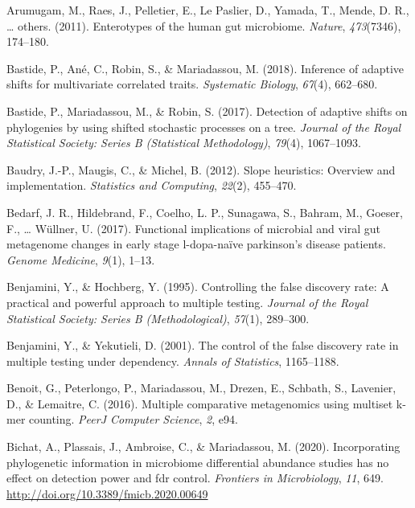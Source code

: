 \documentclass[12pt,a4paper]{reedthesis}
\theoremstyle{definition}
\theoremstyle{definition}
\theoremstyle{definition}
\theoremstyle{remark}
\begin{document}
\leavevmode\hypertarget{ref-arumugam2011enterotypes}{}%
Arumugam, M., Raes, J., Pelletier, E., Le Paslier, D., Yamada, T., Mende, D. R., \ldots{} others. (2011). Enterotypes of the human gut microbiome. \emph{Nature}, \emph{473}(7346), 174--180.

\leavevmode\hypertarget{ref-bastide2018inference}{}%
Bastide, P., Ané, C., Robin, S., \& Mariadassou, M. (2018). Inference of adaptive shifts for multivariate correlated traits. \emph{Systematic Biology}, \emph{67}(4), 662--680.

\leavevmode\hypertarget{ref-bastide2017detection}{}%
Bastide, P., Mariadassou, M., \& Robin, S. (2017). Detection of adaptive shifts on phylogenies by using shifted stochastic processes on a tree. \emph{Journal of the Royal Statistical Society: Series B (Statistical Methodology)}, \emph{79}(4), 1067--1093.

\leavevmode\hypertarget{ref-baudry2012slope}{}%
Baudry, J.-P., Maugis, C., \& Michel, B. (2012). Slope heuristics: Overview and implementation. \emph{Statistics and Computing}, \emph{22}(2), 455--470.

\leavevmode\hypertarget{ref-bedarf2017functional}{}%
Bedarf, J. R., Hildebrand, F., Coelho, L. P., Sunagawa, S., Bahram, M., Goeser, F., \ldots{} Wüllner, U. (2017). Functional implications of microbial and viral gut metagenome changes in early stage l-dopa-naïve parkinson's disease patients. \emph{Genome Medicine}, \emph{9}(1), 1--13.

\leavevmode\hypertarget{ref-benjamini1995controlling}{}%
Benjamini, Y., \& Hochberg, Y. (1995). Controlling the false discovery rate: A practical and powerful approach to multiple testing. \emph{Journal of the Royal Statistical Society: Series B (Methodological)}, \emph{57}(1), 289--300.

\leavevmode\hypertarget{ref-benjamini2001control}{}%
Benjamini, Y., \& Yekutieli, D. (2001). The control of the false discovery rate in multiple testing under dependency. \emph{Annals of Statistics}, 1165--1188.

\leavevmode\hypertarget{ref-benoit2016multiple}{}%
Benoit, G., Peterlongo, P., Mariadassou, M., Drezen, E., Schbath, S., Lavenier, D., \& Lemaitre, C. (2016). Multiple comparative metagenomics using multiset k-mer counting. \emph{PeerJ Computer Science}, \emph{2}, e94.

\leavevmode\hypertarget{ref-bichat2020incorporating}{}%
Bichat, A., Plassais, J., Ambroise, C., \& Mariadassou, M. (2020). Incorporating phylogenetic information in microbiome differential abundance studies has no effect on detection power and fdr control. \emph{Frontiers in Microbiology}, \emph{11}, 649. \url{http://doi.org/10.3389/fmicb.2020.00649}
\end{document}
